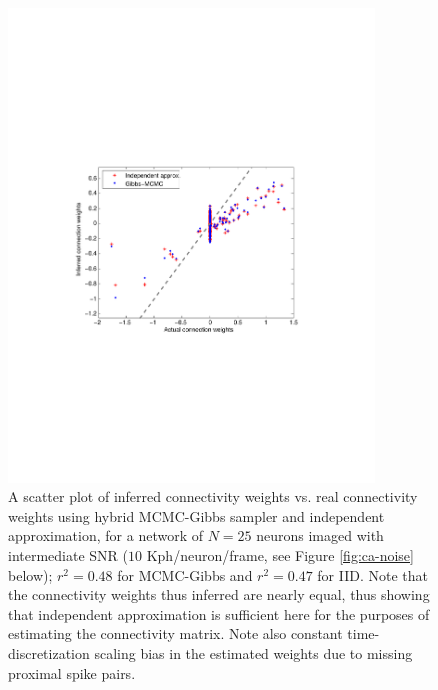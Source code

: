 \begin{figure}
\includegraphics[width=275pt]{../figs/Figure1_fluor_mcmc_vs_iid}
\caption{A scatter plot of inferred connectivity weights vs. real connectivity weights
using hybrid MCMC-Gibbs sampler and independent approximation, for a network of $N=25$ neurons imaged
with intermediate SNR ($10$ Kph/neuron/frame, see Figure \ref{fig:ca-noise} below); $r^2=0.48$ for MCMC-Gibbs and
$r^2=0.47$ for IID. Note that the connectivity weights thus inferred are nearly equal, thus showing that independent approximation is sufficient here for the purposes of estimating the connectivity matrix. Note also constant time-discretization scaling bias in the estimated weights due to missing proximal spike pairs.}
\label{fig:mcmc-iid}
\end{figure}

